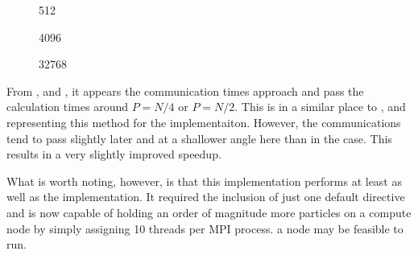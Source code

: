 %
%
\begin{figure}[!h]
    
    \caption{
        \vOneSRTimeCaption
            {\sharedandreplicateddata{}}
            {\pairoperation{}}
            {512}
    }
    \label{fig:v1_shared_and_replicated_pair_operation_512_logtime}
\end  {figure}

\begin{figure}[!h]
    
    \caption{
        \vOneSRTimeCaption{
            \sharedandreplicateddata{}}
            {\pairoperation{}}
            {4096}
    }
    \label{fig:v1_shared_and_replicated_pair_operation_4096_logtime}
\end  {figure}

\begin{figure}[!h]
    
    \caption{
        \vOneSRTimeCaption
            {\sharedandreplicateddata{}}
            {\pairoperation{}}
            {32768}
    }
    \label{fig:v1_shared_and_replicated_pair_operation_32768_logtime}
\end  {figure}

\vOneSRTimeExplanation
    {}
    {}
    {}
    {\pairoperation{}}
    {\sharedandreplicateddata{}}


%
From
,
 and
,
it appears the communication times approach and pass the calculation
times around $P = N/4$ or $P = N/2$.
%
This is in a similar place to
,
 and
representing this method for the \replicateddata{} implementaiton.
%
However, the communications tend to pass slightly later and at a shallower
angle here than in the \replicateddata{} case.
%
This results in a very slightly improved speedup.

What is worth noting, however, is that this implementation performs
at least as well as the \replicateddata{} implementation.
%
It required the inclusion of just one default \openmp{} directive and
is now capable of holding an order of magnitude more particles on
a compute node by simply assigning 10 \openmp{} threads per MPI process.
a node may be feasible to run.
